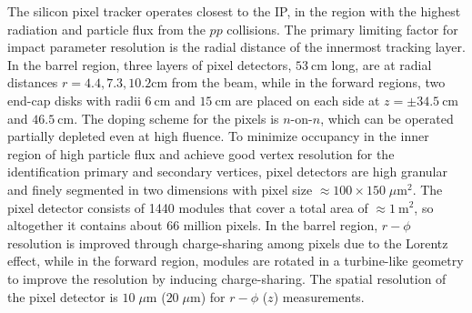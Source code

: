 The silicon pixel tracker operates closest to the IP, in the region with the highest radiation and particle flux from the $pp$ collisions.
The primary limiting factor for impact parameter resolution is the radial distance of the innermost tracking layer.
In the barrel region, three layers of pixel detectors, $\SI{53}{\cm}$ long, are at radial distances $r = 4.4, 7.3, 10.2 \si{\cm}$ from the beam, while in the forward regions, two end-cap disks with radii $\SI{6}{\cm}$ and $\SI{15}{\cm}$ are placed on each side at $z = \pm \SI{34.5}{\cm}$ and $\SI{46.5}{\cm}$.
The doping scheme for the pixels is $n$-on-$n$, which can be operated partially depleted even at high fluence.
To minimize occupancy in the inner region of high particle flux and achieve good vertex resolution for the identification primary and secondary vertices, pixel detectors are high granular and finely segmented in two dimensions with pixel size $\approx 100 \times 150 \; \mu \si{\m \squared}$.
The pixel detector consists of 1440 modules that cover a total area of $\approx \SI{1}{\m \squared}$, so altogether it contains about 66 million pixels.
In the barrel region, $r-\phi$ resolution is improved through charge-sharing among pixels due to the Lorentz effect, while in the forward region, modules are rotated in a turbine-like geometry to improve the resolution by inducing charge-sharing.
The spatial resolution of the pixel detector is $10 \; \mu \si{\m}$ ($20 \; \mu \si{\m}$) for $r-\phi$ ($z$) measurements.

